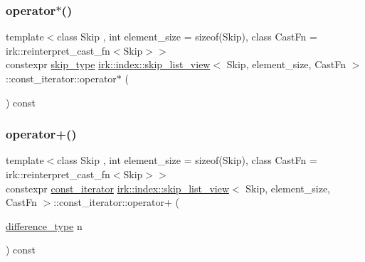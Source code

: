 \subsubsection{\texorpdfstring{operator$\ast$()}{operator*()}}
{\footnotesize\ttfamily template$<$class Skip , int element\+\_\+size = sizeof(\+Skip), class Cast\+Fn  = irk\+::reinterpret\+\_\+cast\+\_\+fn$<$\+Skip$>$$>$ \\
constexpr \mbox{\hyperlink{classirk_1_1index_1_1skip__list__view_a7fa2224428803eee24062bb123978755}{skip\+\_\+type}} \mbox{\hyperlink{classirk_1_1index_1_1skip__list__view}{irk\+::index\+::skip\+\_\+list\+\_\+view}}$<$ Skip, element\+\_\+size, Cast\+Fn $>$\+::const\+\_\+iterator\+::operator$\ast$ (\begin{DoxyParamCaption}{ }\end{DoxyParamCaption}) const\hspace{0.3cm}{\ttfamily [inline]}}

\mbox{\label{structirk_1_1index_1_1skip__list__view_1_1const__iterator_aba748a6a37aa356de30370f76d49303b}} 
\subsubsection{\texorpdfstring{operator+()}{operator+()}}
{\footnotesize\ttfamily template$<$class Skip , int element\+\_\+size = sizeof(\+Skip), class Cast\+Fn  = irk\+::reinterpret\+\_\+cast\+\_\+fn$<$\+Skip$>$$>$ \\
constexpr \mbox{\hyperlink{structirk_1_1index_1_1skip__list__view_1_1const__iterator}{const\+\_\+iterator}} \mbox{\hyperlink{classirk_1_1index_1_1skip__list__view}{irk\+::index\+::skip\+\_\+list\+\_\+view}}$<$ Skip, element\+\_\+size, Cast\+Fn $>$\+::const\+\_\+iterator\+::operator+ (\begin{DoxyParamCaption}\item[{\mbox{\hyperlink{structirk_1_1index_1_1skip__list__view_1_1const__iterator_afcba20bb907a231114679979015f77f5}{difference\+\_\+type}}}]{n }\end{DoxyParamCaption}) const\hspace{0.3cm}{\ttfamily [inline]}}

